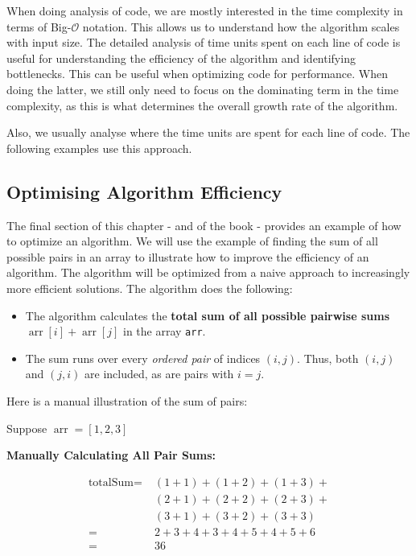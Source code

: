 When doing analysis of code, we are mostly interested in the time complexity in terms of Big-$\mathcal{O}$ notation. This allows us to understand how the algorithm scales with input size. The detailed analysis of time units spent on each line of code is useful for understanding the efficiency of the algorithm and identifying bottlenecks. This can be useful when optimizing code for performance. When doing the latter, we still only need to focus on the dominating term in the time complexity, as this is what determines the overall growth rate of the algorithm.

Also, we usually analyse where the time units are spent for each line of code. The following examples use this approach.

\subsection*{Optimising Algorithm Efficiency}
The final section of this chapter - and of the book - provides an example of how to optimize an algorithm. We will use the example of finding the sum of all possible pairs in an array to illustrate how to improve the efficiency of an algorithm. The algorithm will be optimized from a naive approach to increasingly more efficient solutions. The algorithm does the following:

\begin{itemize}
    \item The algorithm calculates the \textbf{total sum of all possible pairwise sums} $\operatorname{arr}[i]+\operatorname{arr}[j]$ in the array \texttt{arr}.
    \item The sum runs over every \emph{ordered pair} of indices $(i,j)$. Thus, both $(i,j)$ and $(j,i)$ are included, as are pairs with $i=j$.
\end{itemize}

\begin{example} Here is a manual illustration of the sum of pairs:

    Suppose $\operatorname{arr}=[1,2,3]$

   \textbf{ Manually Calculating All Pair Sums:}
    
   \begin{align*}
    \text{totalSum} = & \; (1+1)+(1+2)+(1+3)+ \\
                    & \; (2+1)+(2+2)+(2+3)+ \\
                    & \; (3+1)+(3+2)+(3+3) \\
                    = & \; 2+3+4+3+4+5+4+5+6 \\
                    = & \; 36
    \end{align*}
    
\end{example}

